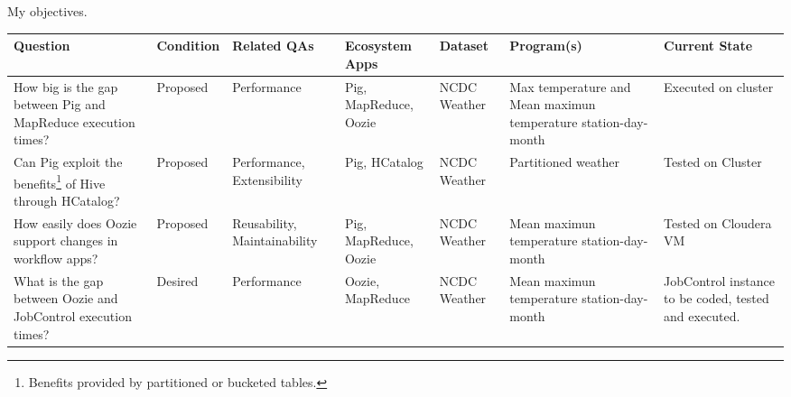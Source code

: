 My objectives.

{\tiny
\begin{center}
    \begin{tabular}{ | p{2.5cm} | p{0.8cm} | p{1.2cm} | p{1.2cm}| p{0.6cm} | p{1.8cm} | p{1.2cm} |}
    \hline
    \textbf{Question} & \textbf{Condition} & \textbf{Related QAs} & \textbf{Ecosystem Apps} & \textbf{Dataset} & \textbf{Program(s)} & \textbf{Current State} \\ \hline
    
    How big is the gap between Pig and MapReduce execution times? & Proposed & Performance & Pig, MapReduce, Oozie & NCDC Weather & Max temperature and Mean maximun temperature station-day-month  & Executed on cluster \\ \hline
   
    Can Pig exploit the benefits\footnote{Benefits provided by partitioned or bucketed tables.} of Hive through HCatalog?  & Proposed & Performance, Extensibility  & Pig, HCatalog & NCDC Weather & Partitioned weather & Tested on Cluster \\ \hline
    
    How easily does Oozie support changes in workflow apps? & Proposed & Reusability, Maintainability & Pig, MapReduce, Oozie & NCDC Weather & Mean maximun temperature station-day-month & Tested on Cloudera VM \\ \hline
    
    What is the gap between Oozie and JobControl execution times? & Desired & Performance & Oozie, MapReduce & NCDC Weather & Mean maximun temperature station-day-month & JobControl instance to be coded, tested and executed. \\ 
   

    \hline
    \end{tabular}
\end{center}
}
